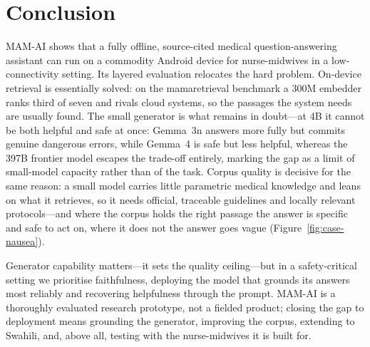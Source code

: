 \section{Conclusion}
\label{sec:conclusion}

MAM-AI shows that a fully offline, source-cited medical question-answering
assistant can run on a commodity Android device for nurse-midwives in a
low-connectivity setting. Its layered evaluation relocates the hard problem.
On-device retrieval is essentially solved: on the mamaretrieval benchmark a 300M
embedder ranks third of seven and rivals cloud systems, so the passages the
system needs are usually found. The small generator is what remains in
doubt---at 4B it cannot be both helpful and safe at once: Gemma~3n answers more
fully but commits genuine dangerous errors, while Gemma~4 is safe but less
helpful, whereas the 397B frontier model escapes the trade-off entirely, marking
the gap as a limit of small-model capacity rather than of the task. Corpus
quality is decisive for the same reason: a small model carries little parametric
medical knowledge and leans on what it retrieves, so it needs official,
traceable guidelines and locally relevant protocols---and where the corpus holds
the right passage the answer is specific and safe to act on, where it does not
the answer goes vague (Figure~\ref{fig:case-nausea}).

Generator capability matters---it sets the quality ceiling---but in a
safety-critical setting we prioritise faithfulness, deploying the model that
grounds its answers most reliably and recovering helpfulness through the prompt.
MAM-AI is a thoroughly evaluated research prototype, not a fielded product;
closing the gap to deployment means grounding the generator, improving the
corpus, extending to Swahili, and, above all, testing with the nurse-midwives it
is built for.
